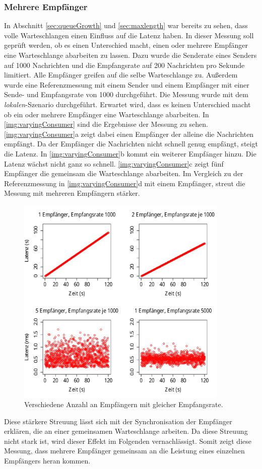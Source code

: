 \subsubsection{Mehrere Empfänger}
\label{sec:varyingConsumer}
In Abschnitt \ref{sec:queueGrowth} und \ref{sec:maxlength} war bereits zu sehen, dass volle Warteschlangen einen Einfluss auf die Latenz haben. In dieser Messung soll geprüft werden, ob es einen Unterschied macht, einen oder mehrere Empfänger eine Warteschlange abarbeiten zu lassen. Dazu wurde die Senderate eines Senders auf 1000 Nachrichten und die Empfangsrate auf 200 Nachrichten pro Sekunde limitiert. Alle Empfänger greifen auf die selbe Warteschlange zu. Außerdem wurde eine Referenzmessung mit einem Sender und einem Empfänger mit einer Sende- und Empfangsrate von 1000 durchgeführt. Die Messung wurde mit dem \textit{lokalen}-Szenario durchgeführt. Erwartet wird, dass es keinen Unterschied macht ob ein oder mehrere Empfänger eine Warteschlange abarbeiten.
In \autoref{img:varyingConsumer} sind die Ergebnisse der Messung zu sehen. \autoref{img:varyingConsumer}a zeigt dabei einen Empfänger der alleine die Nachrichten empfängt. Da der Empfänger die Nachrichten nicht schnell genug empfängt, steigt die Latenz. In \autoref{img:varyingConsumer}b kommt ein weiterer Empfänger hinzu. Die Latenz wächst nicht ganz so schnell. \autoref{img:varyingConsumer}c zeigt fünf Empfänger die gemeinsam die Warteschlange abarbeiten. Im Vergleich zu der Referenzmessung in \autoref{img:varyingConsumer}d mit einem Empfänger, streut die Messung mit mehreren Empfängern stärker.
\begin{figure}
\center
  \includegraphics[width=0.9\textwidth]{images/measurement/varying-consumer.pdf}
  \caption{Verschiedene Anzahl an Empfängern mit gleicher Empfangsrate.}
  \label{img:varyingConsumer}
\end{figure}
Diese stärkere Streuung lässt sich mit der Synchronisation der Empfänger erklären, die an einer gemeinsamen Warteschlange arbeiten. Da diese Streuung nicht stark ist, wird dieser Effekt im Folgenden vernachlässigt. Somit zeigt diese Messung, dass mehrere Empfänger gemeinsam an die Leistung eines einzelnen Empfängers heran kommen. 

